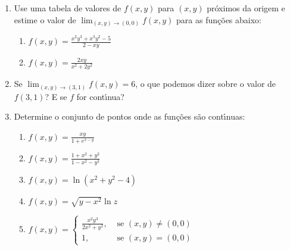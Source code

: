 \documentclass[a4paper,5pt]{amsbook}
\newcommand{\ds}{\displaystyle}
\newcommand{\ra}{\rightarrow}
\begin{document}
\vspace{1cm}
\begin{enumerate}
    \setlength\itemsep{0.5cm}
    \item Use uma tabela de valores de $f(x,y)$ para $(x,y)$ pr\'oximos da origem
    e estime o valor de $\ds\lim_{(x,y)\ra(0,0)} f(x,y)$ para as fun\c{c}\~oes
    abaixo:
        \begin{enumerate}
            \setlength\itemsep{0.2cm}
            \item $f(x,y) = \ds\frac{x^2y^3+x^3y^2-5}{2-xy}$
            \item $f(x,y) = \ds\frac{2xy}{x^2+2y^2}$
        \end{enumerate}

    \item Se $\ds\lim_{(x,y)\ra(3,1)} f(x,y) = 6$, o que podemos dizer sobre o
    valor de $f(3,1)$? E se $f$ for cont\'{\i}nua?

    \item Determine o conjunto de pontos onde as fun\c{c}\~oes s\~ao cont\'{\i}nuas:
        \begin{enumerate}
            \setlength\itemsep{0.2cm}
            \item $f(x,y) = \ds\frac{xy}{1+e^{x-y}}$
            \item $f(x,y) = \ds\frac{1+x^2+y^2}{1-x^2-y^2}$
            \item $f(x,y) = \ln{(x^2+y^2-4)}$
            \item $f(x,y) = \sqrt{y-x^2}\ln{z}$
            \item $f(x,y) = \left\{\begin{array}{cl}
                \ds\frac{x^2y^3}{2x^2+y^2}, & \text{ se } (x,y)\neq(0,0) \\
                1, & \text{ se } (x,y)=(0,0)
                \end{array}\right.$
        \end{enumerate}
\end{enumerate}
\end{document}
